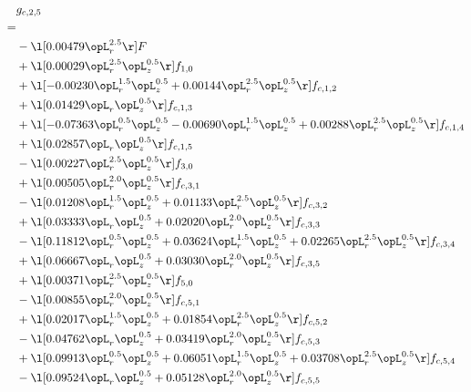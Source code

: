 \begin{alignat}{2} 
\label{eq:g_25_0} 
& g_{c,2,5} \nonumber \\ 
 = \\ 
& - \l[  0.00479 \opL_r^{2.5}  \r] F \nonumber \\ 
& + \l[  0.00029 \opL_r^{2.5} \opL_z^{0.5}  \r] f_{1,0} \nonumber \\ 
& + \l[  -0.00230 \opL_r^{1.5} \opL_z^{0.5} +  0.00144 \opL_r^{2.5} \opL_z^{0.5}  \r] f_{c,1,2} \nonumber \\ 
& + \l[  0.01429 \opL_r \opL_z^{0.5}  \r] f_{c,1,3} \nonumber \\ 
& + \l[  -0.07363 \opL_r^{0.5} \opL_z^{0.5}   -0.00690 \opL_r^{1.5} \opL_z^{0.5} +  0.00288 \opL_r^{2.5} \opL_z^{0.5}  \r] f_{c,1,4} \nonumber \\ 
& + \l[  0.02857 \opL_r \opL_z^{0.5}  \r] f_{c,1,5} \nonumber \\ 
& - \l[  0.00227 \opL_r^{2.5} \opL_z^{0.5}  \r] f_{3,0} \nonumber \\ 
& + \l[  0.00505 \opL_r^{2.0} \opL_z^{0.5}  \r] f_{c,3,1} \nonumber \\ 
& - \l[  0.01208 \opL_r^{1.5} \opL_z^{0.5} +  0.01133 \opL_r^{2.5} \opL_z^{0.5}  \r] f_{c,3,2} \nonumber \\ 
& + \l[  0.03333 \opL_r \opL_z^{0.5} +  0.02020 \opL_r^{2.0} \opL_z^{0.5}  \r] f_{c,3,3} \nonumber \\ 
& - \l[  0.11812 \opL_r^{0.5} \opL_z^{0.5} +  0.03624 \opL_r^{1.5} \opL_z^{0.5} +  0.02265 \opL_r^{2.5} \opL_z^{0.5}  \r] f_{c,3,4} \nonumber \\ 
& + \l[  0.06667 \opL_r \opL_z^{0.5} +  0.03030 \opL_r^{2.0} \opL_z^{0.5}  \r] f_{c,3,5} \nonumber \\ 
& + \l[  0.00371 \opL_r^{2.5} \opL_z^{0.5}  \r] f_{5,0} \nonumber \\ 
& - \l[  0.00855 \opL_r^{2.0} \opL_z^{0.5}  \r] f_{c,5,1} \nonumber \\ 
& + \l[  0.02017 \opL_r^{1.5} \opL_z^{0.5} +  0.01854 \opL_r^{2.5} \opL_z^{0.5}  \r] f_{c,5,2} \nonumber \\ 
& - \l[  0.04762 \opL_r \opL_z^{0.5} +  0.03419 \opL_r^{2.0} \opL_z^{0.5}  \r] f_{c,5,3} \nonumber \\ 
& + \l[  0.09913 \opL_r^{0.5} \opL_z^{0.5} +  0.06051 \opL_r^{1.5} \opL_z^{0.5} +  0.03708 \opL_r^{2.5} \opL_z^{0.5}  \r] f_{c,5,4} \nonumber \\ 
& - \l[  0.09524 \opL_r \opL_z^{0.5} +  0.05128 \opL_r^{2.0} \opL_z^{0.5}  \r] f_{c,5,5} \nonumber \\ 
\end{alignat} 


